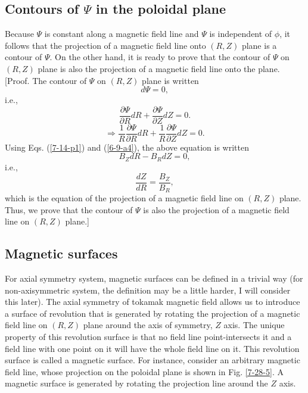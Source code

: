 \documentclass{article}
\begin{document}
\subsection{Contours of $\Psi$ in the poloidal plane}\label{20-5-8-p1}

Because $\Psi$ is constant along a magnetic field line and $\Psi$ is
independent of $\phi$, it follows that the projection of a magnetic field line
onto $(R, Z)$ plane is a contour of $\Psi$. On the other hand, it is ready to
prove that the contour of $\Psi$ on $(R, Z)$ plane is also the projection of a
magnetic field line onto the plane. [Proof. The contour of $\Psi$ on $(R, Z)$
plane is written
\begin{equation}
  d \Psi = 0,
\end{equation}
i.e.,
\begin{equation}
  \frac{\partial \Psi}{\partial R} d R + \frac{\partial \Psi}{\partial Z} d Z
  = 0.
\end{equation}
\begin{equation}
  \Rightarrow \frac{1}{R}  \frac{\partial \Psi}{\partial R} d R + \frac{1}{R} 
  \frac{\partial \Psi}{\partial Z} d Z = 0.
\end{equation}
Using Eqs. (\ref{7-14-p1}) and (\ref{6-9-a4}), the above equation is written
\begin{equation}
  B_Z d R - B_R d Z = 0,
\end{equation}
i.e.,
\begin{equation}
  \label{8-22-1} \frac{d Z}{d R} = \frac{B_Z}{B_R},
\end{equation}
which is the equation of the projection of a magnetic field line on $(R, Z)$
plane. Thus, we prove that the contour of $\Psi$ is also the projection of a
magnetic field line on $(R, Z)$ plane.]

\subsection{Magnetic surfaces}

For axial symmetry system, magnetic surfaces can be defined in a trivial way
(for non-axisymmetric system, the definition may be a little harder, I will
consider this later). The axial symmetry of tokamak magnetic field allows us
to introduce a surface of revolution that is generated by rotating the
projection of a magnetic field line on $(R, Z)$ plane around the axis of
symmetry, $Z$ axis. The unique property of this revolution surface is that no
field line point-intersects it and a field line with one point on it will have
the whole field line on it. This revolution surface is called a magnetic
surface. For instance, consider an arbitrary magnetic field line, whose
projection on the poloidal plane is shown in Fig. \ref{7-28-5}. A magnetic
surface is generated by rotating the projection line around the $Z$ axis.
\end{document}
